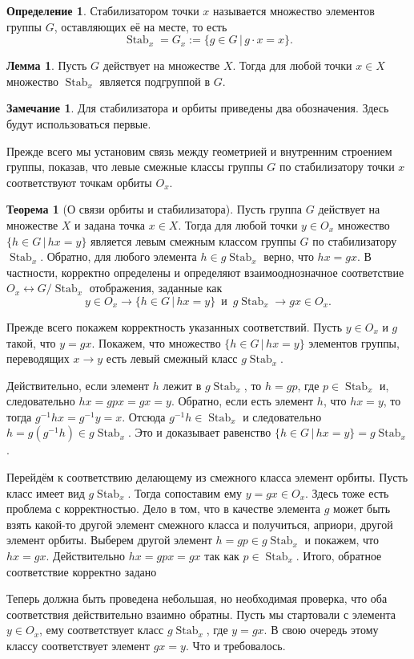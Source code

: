 \documentclass[10pt,a4paper,oneside]{book}
\theoremstyle{definition}
\newtheorem*{rem}{\color{green!50!blue}Замечание}
\newtheorem*{defn}{\color{yellow!30!red} Определение}
\newtheorem{thm}{\color{red!40!black}Теорема}
\newtheorem{lem}{\color{green!50!black}Лемма}
\newcommand{\Stab}{\operatorname{Stab}}
\def\thrm{\begin{thm}}
\def\ethrm{\end{thm}}
\def\dfn{\begin{defn}}
\def\edfn{\end{defn}}
\def\lm{\begin{lem}}
\def\elm{\end{lem}}
\def\rm{\begin{rem}}
\def\erm{\end{rem}}
\begin{document}
\dfn
Стабилизатором точки $x$ называется множество элементов группы $G$, оставляющих её на месте, то есть
$$\Stab_x=G_x:= \{g\in G \,|\, g\cdot x=x\}.$$
\edfn

\lm Пусть $G$ действует на множестве $X$. Тогда для любой точки $x\in X$ множество $\Stab_x$ является подгруппой в $G$.
\elm

\rm
Для стабилизатора и орбиты приведены два обозначения. Здесь будут использоваться первые.
\erm








Прежде всего мы установим связь между геометрией  и внутренним строением группы, показав, что  левые смежные классы группы $G$ по стабилизатору точки $x$ соответствуют точкам орбиты $O_x$.

\thrm[О связи орбиты и стабилизатора] Пусть группа $G$ действует на множестве $X$ и задана точка $x \in X$. Тогда для любой точки $y \in O_x$ множество $\{h\in G\,|\, hx=y\}$ является левым смежным классом группы $G$ по стабилизатору $\Stab_x$. Обратно, для любого элемента $h\in g\Stab_x$ верно, что $hx=gx$. В частности, корректно определены и определяют взаимооднозначное соответствие $O_x \leftrightarrow G/\Stab_x$ отображения, заданные как $$y\in O_x \to \{h\in G\,|\, hx=y\}\, \text{ и }\, g\Stab_x \to gx \in O_x.$$
\ethrm
\proof Прежде всего покажем корректность указанных соответствий. Пусть $y\in O_x$ и $g$ такой, что $y=gx$. Покажем, что множество $\{h\in G\,|\, hx=y\}$ элементов группы, переводящих $x \to y$ есть левый смежный класс $g\Stab_x$. 

Действительно, если элемент $h$ лежит в $g\Stab_x$, то $h=gp$, где $p \in\Stab_x$ и, следовательно $hx=gpx=gx=y$. Обратно, если есть элемент $h$, что $hx=y$, то тогда $g^{-1}hx=g^{-1}y=x$. Отсюда $g^{-1}h \in\Stab_x$ и следовательно $h=g(g^{-1}h) \in g\Stab_x$. Это и доказывает равенство $\{h\in G\,|\, hx=y\}=g\Stab_x$.


Перейдём к соответствию делающему из смежного класса элемент орбиты. Пусть класс имеет вид $g\Stab_x$. Тогда сопоставим ему $y=gx \in O_x$. Здесь тоже есть проблема с корректностью. Дело в том, что в качестве элемента $g$ может быть взять какой-то другой элемент смежного класса и получиться, априори, другой элемент орбиты. Выберем другой элемент $h=gp\in g\Stab_x$ и  покажем, что $hx=gx$. Действительно $hx=gpx=gx$ так как $p\in\Stab_x$. Итого, обратное соответствие корректно задано

Теперь должна быть проведена небольшая, но необходимая проверка, что оба соответствия действительно взаимно обратны. 
Пусть мы стартовали с элемента $y\in O_x$, ему соответствует класс $g\Stab_x$, где $y=gx$. В свою очередь этому классу соответствует элемент $gx=y$. Что и требовалось. 
\end{document}
